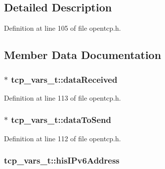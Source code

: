 \subsection{Detailed Description}


Definition at line 105 of file opentcp.\+h.



\subsection{Member Data Documentation}
\subsubsection[{\texorpdfstring{data\+Received}{dataReceived}}]{$\ast$ tcp\+\_\+vars\+\_\+t\+::data\+Received}\hypertarget{structtcp__vars__t_af774183effd1c202ca02a3bcb8ef9023}{}\label{structtcp__vars__t_af774183effd1c202ca02a3bcb8ef9023}


Definition at line 113 of file opentcp.\+h.

\subsubsection[{\texorpdfstring{data\+To\+Send}{dataToSend}}]{$\ast$ tcp\+\_\+vars\+\_\+t\+::data\+To\+Send}\hypertarget{structtcp__vars__t_a5170824574c33f3c7ddcfb4417b5a8e8}{}\label{structtcp__vars__t_a5170824574c33f3c7ddcfb4417b5a8e8}


Definition at line 112 of file opentcp.\+h.

\subsubsection[{\texorpdfstring{his\+I\+Pv6\+Address}{hisIPv6Address}}]{ tcp\+\_\+vars\+\_\+t\+::his\+I\+Pv6\+Address}\hypertarget{structtcp__vars__t_a844854565e6e9f990097576d4fb18cb0}{}\label{structtcp__vars__t_a844854565e6e9f990097576d4fb18cb0}


